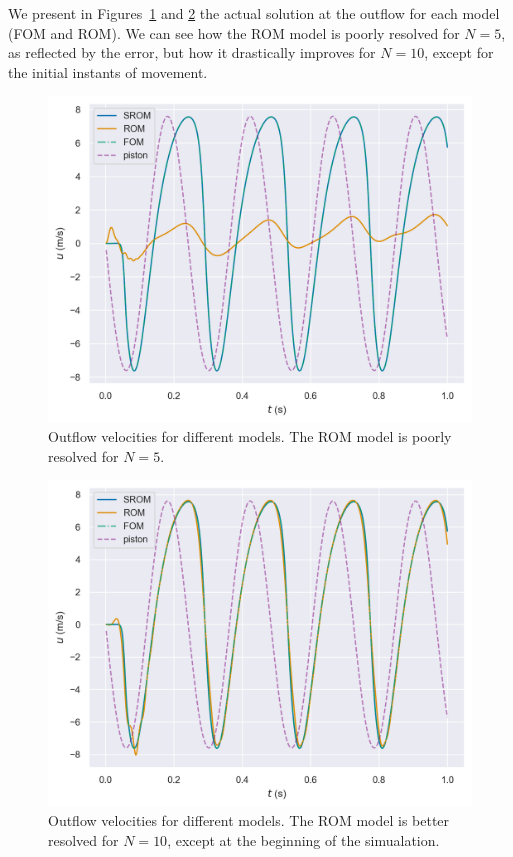 \documentclass[../../thesis.tex]{subfiles}
\begin{document}
We present in Figures~\ref{fig:outflow_model_comparison_N_5} and \ref{fig:outflow_model_comparison_N_10} 
the actual solution at the outflow for each model (FOM and ROM).
We can see how the ROM model is poorly resolved for $N=5$, as reflected by the error,
but how it drastically improves for $N=10$, except for the initial instants of movement.
\begin{figure}[h]
    \centering
    \includegraphics[width=\columnwidth]{research_project/piston/figures/rb_certification/outflow_probes_comparison_rom_5_srom_15_online_0.png}
    \caption{Outflow velocities for different models. The ROM model is poorly resolved for $N=5$.}
    \label{fig:outflow_model_comparison_N_5}
\end{figure}
\begin{figure}[h]
    \centering
    \includegraphics[width=\columnwidth]{research_project/piston/figures/rb_certification/outflow_probes_comparison_rom_10_srom_20_online_0.png}
    \caption{Outflow velocities for different models. 
    The ROM model is better resolved for $N=10$, except at the beginning of the simualation.}
    \label{fig:outflow_model_comparison_N_10}
\end{figure}
\end{document}
